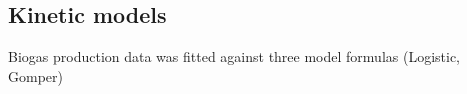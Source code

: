 \subsection{Kinetic models}
Biogas production data was fitted against three model formulas (Logistic, Gomper)